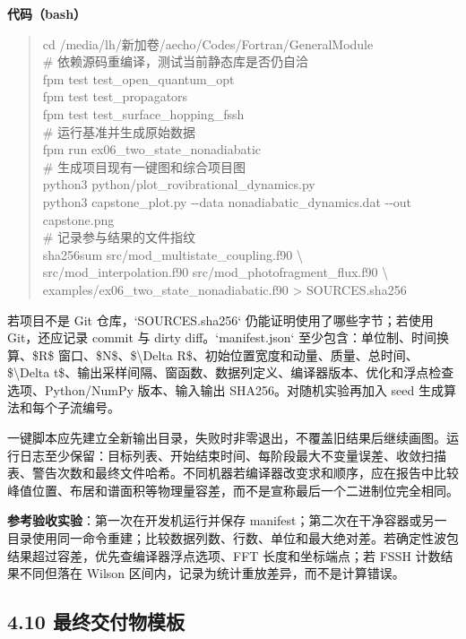\documentclass[UTF8,openany,11pt,fontset=fandol]{ctexbook}
\begin{document}
\textbf{代码（bash）}

\begin{quote}
cd /media/lh/新加卷/aecho/Codes/Fortran/GeneralModule\\
\# 依赖源码重编译，测试当前静态库是否仍自洽\\
fpm test test\_open\_quantum\_opt\\
fpm test test\_propagators\\
fpm test test\_surface\_hopping\_fssh\\
\# 运行基准并生成原始数据\\
fpm run ex06\_two\_state\_nonadiabatic\\
\# 生成项目现有一键图和综合项目图\\
python3 python/plot\_rovibrational\_dynamics.py\\
python3 capstone\_plot.py -\/-data nonadiabatic\_dynamics.dat -\/-out
capstone.png\\
\# 记录参与结果的文件指纹\\
sha256sum src/mod\_multistate\_coupling.f90 \textbackslash{}\\
src/mod\_interpolation.f90 src/mod\_photofragment\_flux.f90
\textbackslash{}\\
examples/ex06\_two\_state\_nonadiabatic.f90 \textgreater{}
SOURCES.sha256
\end{quote}

若项目不是 Git 仓库，`SOURCES.sha256` 仍能证明使用了哪些字节；若使用
Git，还应记录 commit 与 dirty diff。`manifest.json`
至少包含：单位制、时间换算、\$R\$ 窗口、\$N\$、\$\textbackslash Delta
R\$、初始位置宽度和动量、质量、总时间、\$\textbackslash Delta
t\$、输出采样间隔、窗函数、数据列定义、编译器版本、优化和浮点检查选项、Python/NumPy
版本、输入输出 SHA256。对随机实验再加入 seed 生成算法和每个子流编号。

一键脚本应先建立全新输出目录，失败时非零退出，不覆盖旧结果后继续画图。运行日志至少保留：目标列表、开始结束时间、每阶段最大不变量误差、收敛扫描表、警告次数和最终文件哈希。不同机器若编译器改变求和顺序，应在报告中比较峰值位置、布居和谱面积等物理量容差，而不是宣称最后一个二进制位完全相同。

\textbf{参考验收实验}：第一次在开发机运行并保存
manifest；第二次在干净容器或另一目录使用同一命令重建；比较数据列数、行数、单位和最大绝对差。若确定性波包结果超过容差，优先查编译器浮点选项、FFT
长度和坐标端点；若 FSSH 计数结果不同但落在 Wilson
区间内，记录为统计重放差异，而不是计算错误。

\subsection{\texorpdfstring{\textbf{4.10
最终交付物模板}}{4.10 最终交付物模板}}\label{ux6700ux7ec8ux4ea4ux4ed8ux7269ux6a21ux677f}
\end{document}
